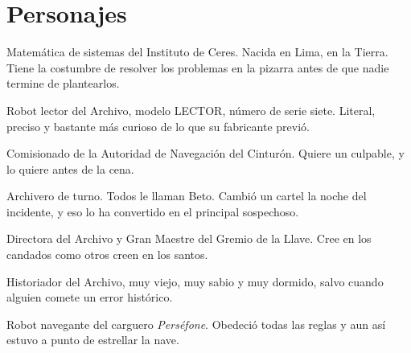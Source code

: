 \thispagestyle{empty}
\section*{Personajes}
\begin{description}[leftmargin=0pt,itemsep=3mm,font=\scshape\color{oxido}]
\item[Inés Calderón] Matemática de sistemas del Instituto de Ceres. Nacida en Lima, en la Tierra. Tiene la costumbre de resolver los problemas en la pizarra antes de que nadie termine de plantearlos.
\item[Siete] Robot lector del Archivo, modelo LECTOR, número de serie siete. Literal, preciso y bastante más curioso de lo que su fabricante previó.
\item[Aurelio Mendieta] Comisionado de la Autoridad de Navegación del Cinturón. Quiere un culpable, y lo quiere antes de la cena.
\item[Benito Arce] Archivero de turno. Todos le llaman Beto. Cambió un cartel la noche del incidente, y eso lo ha convertido en el principal sospechoso.
\item[Helga Sørensen] Directora del Archivo y Gran Maestre del Gremio de la Llave. Cree en los candados como otros creen en los santos.
\item[Emeric Loew] Historiador del Archivo, muy viejo, muy sabio y muy dormido, salvo cuando alguien comete un error histórico.
\item[ANA-3] Robot navegante del carguero \emph{Perséfone}. Obedeció todas las reglas y aun así estuvo a punto de estrellar la nave.
\end{description}
\clearpage
